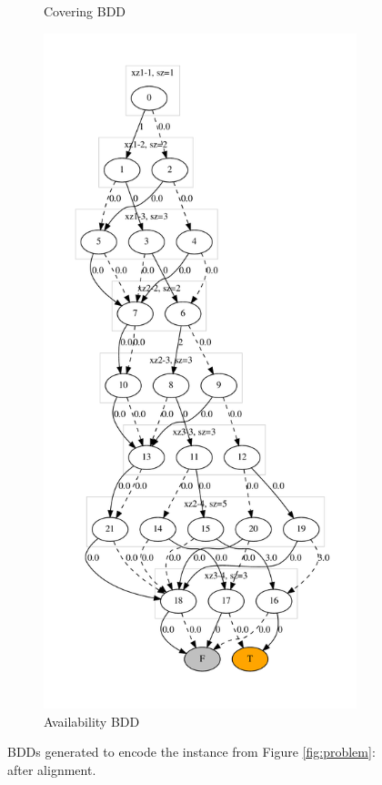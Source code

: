 \documentclass[11pt]{article}
\begin{document}
\begin{figure}[t!]
\begin{subfigure}[t]{0.45\textwidth}
    \caption{Covering BDD}\label{fig:coverA}
  \end{subfigure}%
  \hfill
  \begin{subfigure}[t]{0.45\textwidth}
    \includegraphics[height=\textheight]{./A_aligned.dot.pdf}
    \caption{Availability BDD}\label{fig:availA}
  \end{subfigure}
  \caption{BDDs generated to encode the instance from Figure \ref{fig:problem}: after alignment.}
\end{figure}
\end{document}
